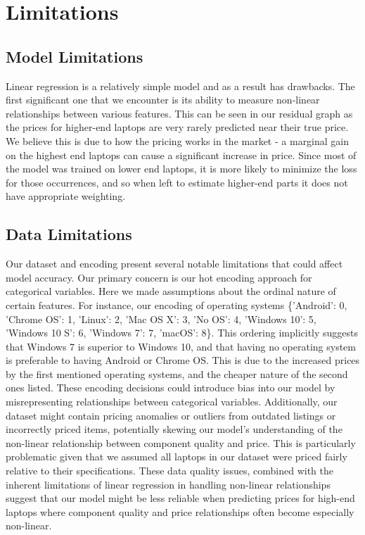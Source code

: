 \documentclass{article}
\begin{document}
\section{Limitations}

\subsection{Model Limitations}

Linear regression is a relatively simple model and as a result has drawbacks. The first significant one that we encounter is its ability to measure non-linear relationships between various features. This can be seen in our residual graph as the prices for higher-end laptops are very rarely predicted near their true price. We believe this is due to how the pricing works in the market - a marginal gain on the highest end laptops can cause a significant increase in price. Since most of the model was trained on lower end laptops, it is more likely to minimize the loss for those occurrences, and so when left to estimate higher-end parts it does not have appropriate weighting.

\subsection{Data Limitations}

Our dataset and encoding present several notable limitations that could affect model accuracy. Our primary concern is our hot encoding approach for categorical variables. Here we made assumptions about the ordinal nature of certain features. For instance, our encoding of operating systems \{'Android': 0, 'Chrome OS': 1, 'Linux': 2, 'Mac OS X': 3, 'No OS': 4, 'Windows 10': 5, 'Windows 10 S': 6, 'Windows 7': 7, 'macOS': 8\}. This ordering implicitly suggests that Windows 7 is superior to Windows 10, and that having no operating system is preferable to having Android or Chrome OS. This is due to the increased prices by the first mentioned operating systems, and the cheaper nature of the second ones listed. These encoding decisions could introduce bias into our model by misrepresenting relationships between categorical variables. Additionally, our dataset might contain pricing anomalies or outliers from outdated listings or incorrectly priced items, potentially skewing our model's understanding of the non-linear relationship between component quality and price. This is particularly problematic given that we assumed all laptops in our dataset were priced fairly relative to their specifications. These data quality issues, combined with the inherent limitations of linear regression in handling non-linear relationships suggest that our model might be less reliable when predicting prices for high-end laptops where component quality and price relationships often become especially non-linear.
\end{document}
